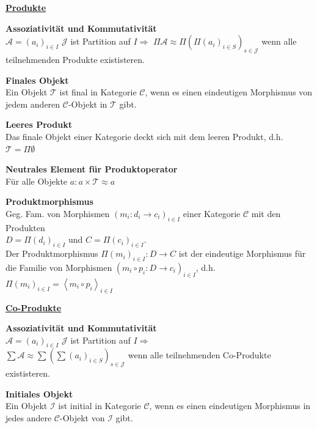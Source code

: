 \begin{multicols}{2}

\textbf{\underline{Produkte}} 

\textbf{ Assoziativität und Kommutativität} \\
$\mathcal{A} = (a_i)_{i \in I}$ $\mathcal{J}$ ist Partition auf $I \Rightarrow$ $\Pi \mathcal{A} \approx \Pi(\Pi(a_i)_{i \in S})_{s \in \mathcal{J}}$ wenn alle teilnehmenden Produkte exististeren.


\textbf{ Finales Objekt} \\
Ein Objekt $\mathcal{T}$ ist final in Kategorie $\mathcal{C}$, wenn es einen eindeutigen Morphismus von jedem anderen $\mathcal{C}$-Objekt in $\mathcal{T}$ gibt.

\textbf{ Leeres Produkt} \\
Das finale Objekt einer Kategorie deckt sich mit dem leeren Produkt, d.h. $\mathcal{T} = \Pi \emptyset$

\textbf{ Neutrales Element für Produktoperator} \\
Für alle Objekte $a: a \times \mathcal{T} \approx a$

\textbf{ Produktmorphismus} \\
Geg. Fam. von Morphismen $\left(m_{i}:d_{i}\rightarrow c_{i}\right)_{i\in I}$ einer Kategorie $\mathcal{C}$ mit den Produkten \\ $D=\Pi(d_{i})_{i\in I}$
und $C=\Pi(c_{i})_{i\in I}$. \\ Der Produktmorphismus $\Pi(m_{i})_{i\in I}:D\rightarrow C$
ist der eindeutige Morphismus für die Familie von Morphismen
$\left(m_{i}\circ p_{i}:D\rightarrow c_{i}\right)_{i\in I}$,
d.h. $\Pi(m_{i})_{i\in I}=\left\langle m_{i}\circ p_{i}\right\rangle _{i\in I}$

\columnbreak

\textbf{\underline{Co-Produkte}} 

\textbf{ Assoziativität und Kommutativität} \\
$\mathcal{A} = (a_i)_{i \in I}$ $\mathcal{J}$ ist Partition auf $I \Rightarrow$ \\ $\sum \mathcal{A} \approx \sum(\sum(a_i)_{i \in S})_{s \in \mathcal{J}}$ wenn alle teilnehmenden Co-Produkte exististeren.


\textbf{ Initiales Objekt} \\
Ein Objekt $\mathcal{I}$ ist initial in Kategorie $\mathcal{C}$, wenn es einen eindeutigen Morphismus in jedes andere $\mathcal{C}$-Objekt von $\mathcal{I}$ gibt.


\end{multicols}
